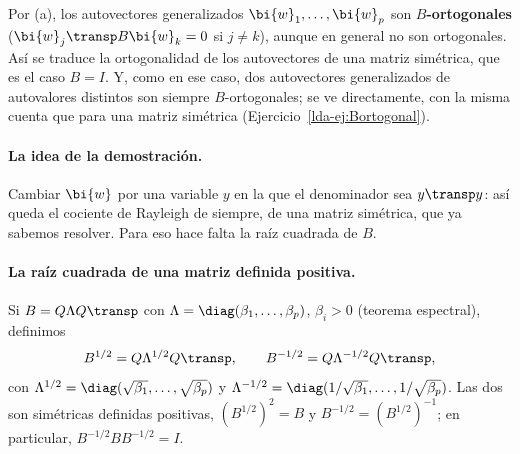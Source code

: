 Por (a), los autovectores generalizados $\bi{w}_1,\dots,\bi{w}_p$ son
\textbf{$B$-ortogonales} ($\bi{w}_j\transp B\bi{w}_k=0$ si $j\ne k$), aunque en general
no son ortogonales. Así se traduce la ortogonalidad de los autovectores de una
matriz simétrica, que es el caso $B=I$. Y, como en ese caso, dos autovectores
generalizados de autovalores distintos son siempre $B$-ortogonales; se ve
directamente, con la misma cuenta que para una matriz simétrica
(Ejercicio~\ref{lda-ej:Bortogonal}).

\paragraph{La idea de la demostración.} Cambiar $\bi{w}$ por una variable $y$ en la
que el denominador sea $y\transp y$: así queda el cociente de Rayleigh de
siempre, de una matriz simétrica, que ya sabemos resolver. Para eso hace falta
la raíz cuadrada de $B$.

\paragraph{La raíz cuadrada de una matriz definida positiva.} Si
$B=Q\Lambda Q\transp$ con $\Lambda=\diag(\beta_1,\dots,\beta_p)$, $\beta_i>0$
(teorema espectral), definimos
\[
B^{1/2}=Q\Lambda^{1/2}Q\transp,\qquad B^{-1/2}=Q\Lambda^{-1/2}Q\transp ,
\]
con $\Lambda^{1/2}=\diag(\sqrt{\beta_1},\dots,\sqrt{\beta_p})$ y
$\Lambda^{-1/2}=\diag(1/\sqrt{\beta_1},\dots,1/\sqrt{\beta_p})$. Las dos son
simétricas definidas positivas, $(B^{1/2})^2=B$ y $B^{-1/2}=(B^{1/2})^{-1}$;
en particular, $B^{-1/2}BB^{-1/2}=I$.

